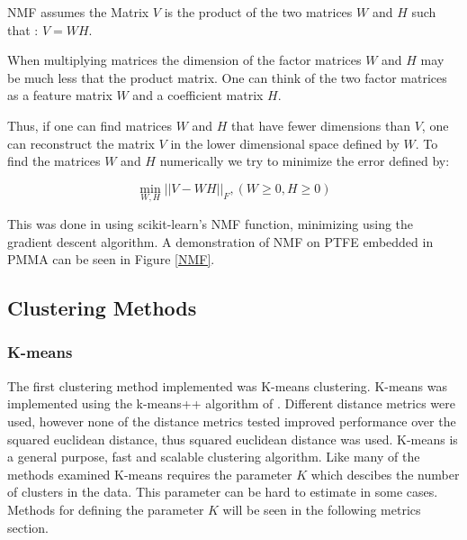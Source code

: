 \documentclass[a4paper,11pt]{article}
\begin{document}
NMF assumes the Matrix $V$ is the product of the two matrices $W$ and $H$ such that : $V = WH$. 

When multiplying matrices the dimension of the factor matrices $W$ and $H$ may be much less that the product matrix. One can think of the two factor matrices as a feature matrix $W$ and a coefficient matrix $H$.

Thus, if one can find matrices $W$ and $H$ that have fewer dimensions than $V$, one can reconstruct the matrix $V$ in the lower dimensional space defined by $W$. To find the matrices $W$ and $H$ numerically we try to minimize the error defined by:

\begin{equation}
\min_{W,H} || V - WH ||_F, ( W \geq 0, H \geq 0 )
\end{equation}

This was done in using scikit-learn's NMF function, minimizing using the gradient descent algorithm. A demonstration of NMF on PTFE embedded in PMMA can be seen in Figure \ref{NMF}.

\subsection{Clustering Methods}

\subsubsection{K-means}

The first clustering method implemented was K-means clustering. K-means was implemented using the k-means++ algorithm of \cite{ArthurK-means++:Seeding}. Different distance metrics were used, however none of the distance metrics tested improved performance over the squared euclidean distance, thus squared euclidean distance was used. K-means is a general purpose, fast and scalable clustering algorithm. Like many of the methods examined K-means requires the parameter $K$ which descibes the number of clusters in the data. This parameter can be hard to estimate in some cases. Methods for defining the parameter $K$ will be seen in the following metrics section.
\end{document}
